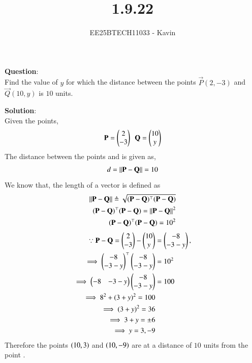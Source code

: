 \documentclass[journal]{IEEEtran}
\begin{document}

\vspace{3cm}

\title{1.9.22}
\author{EE25BTECH11033 - Kavin}
{\let\newpage\relax\maketitle}

\renewcommand{\thefigure}{\theenumi}
\renewcommand{\thetable}{\theenumi}
\setlength{\intextsep}{10pt} %
\textbf{Question}:\\
Find the value of $y$ for which the distance between the points $\vec{P}(2,-3)$ and $\vec{Q}(10,y)$ is $10$ units.\\
\bigskip

\textbf{Solution}:\\
Given the points,
\begin{align}
    \vec{P}=\begin{myvec}{2\\-3}\end{myvec}\ \ 
    \vec{Q}=\begin{myvec}{10\\y}\end{myvec}
\end{align}
The distance between the points  and  is given as,
\begin{align}
d = \left\lVert\mathbf{P}-\mathbf{Q}\right\rVert = 10\\
\end{align}
We know that, the length of a vector is defined as
\begin{align}
\label{eq:side-length}
	\left\lVert\mathbf{P}-\mathbf{Q}\right\rVert \triangleq \sqrt{(\mathbf{P}-\mathbf{Q})^{\top}(\mathbf{P}-\mathbf{Q})}
		\\
(\mathbf{P}-\mathbf{Q})^\top (\mathbf{P}-\mathbf{Q}) = \left\lVert\mathbf{P}-\mathbf{Q}\right\rVert^2\\
(\mathbf{P}-\mathbf{Q})^\top (\mathbf{P}-\mathbf{Q}) = 10^2\\
\end{align}
\begin{align}
\because
		\mathbf{P} - \mathbf{Q} = \begin{pmatrix}2\\-3\end{pmatrix} - \begin{pmatrix}10\\y\end{pmatrix} &= \begin{pmatrix}-8\\-3-y\end{pmatrix},\\
        \implies\begin{pmatrix}-8\\-3-y\end{pmatrix}^\top\begin{pmatrix}-8\\-3-y\end{pmatrix} &= 10^2\\
        \implies\begin{pmatrix}-8 & -3-y\end{pmatrix}\begin{pmatrix}-8\\-3-y\end{pmatrix} &= 100\\
        \implies8^2 + (3+y)^2 = 100\\
        \implies(3+y)^2=36\\
        \implies3+y=\pm6\\
        \implies y=3, -9
\end{align}
Therefore the points $\left(10,3\right)$ and $\left(10,-9\right)$ are at a distance of $10$ units from the point .
\bigskip
\end{document}
